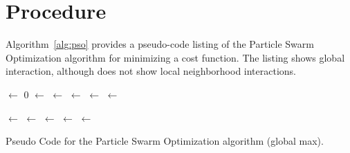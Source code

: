 \documentclass[a4paper, 11pt]{article}
\begin{document}
\section{Procedure}
\label{sec:procedure}
Algorithm~\ref{alg:pso} provides a pseudo-code listing of the Particle Swarm Optimization algorithm for minimizing a cost function. The listing shows global interaction, although does not show local neighborhood interactions.

\begin{algorithm}[htp]
	\SetLine  

	
	\KwIn{\ProblemSize, \PopulationSize}		
	\KwOut{\GlobalBest}

	\Population $\leftarrow$ $0$\;
	 {
		\CurrentPosition $\leftarrow$ \RandomPosition{\PopulationSize}\;
		\CurrentVelocity $\leftarrow$ \RandomVelocity{}\;
		\CurrentCost $\leftarrow$ \Cost{\CurrentPosition}\;
		\CurrentBest $\leftarrow$ \CurrentPosition\;
		\If{\CurrentCost $\leq$ \GlobalBest} {
			\GlobalBest $\leftarrow$ \CurrentBest\;
		}
	}	

	\While{$\neg$\StopCondition{}} {
		\ForEach{\Particle $\in$ \Population} {
			\CurrentVelocity $\leftarrow$ \UpdateVelocity{\CurrentVelocity, \GlobalBest, \CurrentBest}\;
			\CurrentPosition $\leftarrow$ \UpdatePosition{\CurrentPosition, \CurrentVelocity}\;
			\CurrentCost $\leftarrow$ \Cost{\CurrentPosition}\;
			\If{\CurrentCost $\leq$ \CurrentBest} {
				\CurrentBest $\leftarrow$ \CurrentPosition\;
				\If{\CurrentCost $\leq$ \GlobalBest} {
					\GlobalBest $\leftarrow$ \CurrentBest\;
				}
			}
		}		
	}
	\Return{\GlobalBest}\;
	\caption{Pseudo Code for the Particle Swarm Optimization algorithm (global max).}
	\label{alg:pso}
\end{algorithm}
\end{document}
